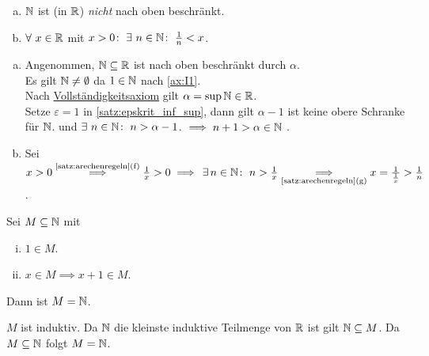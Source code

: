 \documentclass[../ana1.tex]{subfiles}
\begin{document}
\begin{satz}\label{satz:arch_prinz}\leavevmode
	\begin{enumerate}[(a)]
		\item \(\mathbb{N} \) ist (in \(\mathbb{R} \)) \textit{nicht} nach oben beschränkt.
		\item \(\forall \, x \in \R \) mit \(x > 0 \colon \; \exists \, n \in \N \colon \; \frac{1}{n} < x \).
	\end{enumerate}
\end{satz}
\begin{bew}\leavevmode
	\begin{enumerate}[(a)]
		\item Angenommen, \(\mathbb{N} \subseteq \mathbb{R} \) ist nach oben beschränkt durch \(\alpha \). \\
		      Es gilt \(\mathbb{N} \neq \emptyset \) da \(1 \in \mathbb{N} \) nach \autoref{ax:I1}. \\
		      Nach \hyperref[ax:V]{Vollständigkeitsaxiom} gilt \(\alpha = \sup \mathbb{N} \in \mathbb{R} \). \\
		      Setze \(\varepsilon = 1 \) in \autoref{satz:epskrit_inf_sup}, dann gilt \(\alpha - 1 \) ist keine obere Schranke für \(\mathbb{N} \).
		      und \(\exists \, n \in \N \colon \; n > \alpha - 1 \).
			  \(\implies n+1 > \alpha \in \mathbb{N} \) \Lightning.
		\item Sei \(x > 0 \oversett{\autoref{satz:arechenregeln}{(f)}}{\implies} \frac{1}{x} > 0 \implies \, \exists n \in \N \colon \; n > \frac{1}{x} \\
		      \undersett{\autoref{satz:arechenregeln}{(g)}}{\implies} x = \frac{1}{\frac{1}{x}} > \frac{1}{n} \).\qedhere
	\end{enumerate}
\end{bew}

\begin{satz}[Induktionsprinzip]\label{satz:ind_prinz}
	Sei \(M \subseteq \mathbb{N} \) mit
	\begin{enumerate}[(i)]
		\item \(1\in M \).
		\item \(x \in M \implies x + 1 \in M \).
	\end{enumerate}
	Dann ist \(M = \mathbb{N} \).
\end{satz}
\begin{bew}
	\(M \) ist induktiv. Da \(\mathbb{N} \) die kleinste induktive Teilmenge von \(\mathbb{R} \) ist gilt \(\mathbb{N} \subseteq M \).
	Da \(M \subseteq \mathbb{N} \) folgt \(M = \mathbb{N} \).
\end{bew}
\end{document}
